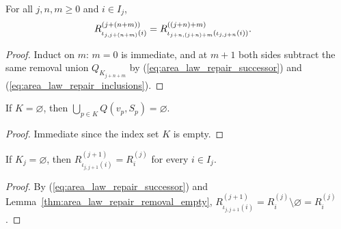 \begin{lemma}
    \label{thm:area_law_repair_current_inclusion_add}
    \leanok
    For all $j,n,m\ge0$ and $i\in I_j$,
    \begin{align}
        R_{\iota_{j,j+(n+m)}(i)}^{(j+(n+m))}
         & =R_{\iota_{j+n,(j+n)+m}(\iota_{j,j+n}(i))}^{((j+n)+m)}.\notag
    \end{align}
\end{lemma}

\begin{proof}\leanok
    Induct on $m$: $m=0$ is immediate, and at $m+1$ both sides subtract the same removal union
    $Q_{K_{j+n+m}}$ by (\ref{eq:area_law_repair_successor}) and (\ref{eq:area_law_repair_inclusions}).
\end{proof}

\begin{lemma}
    \label{thm:area_law_repair_removal_empty}
    \leanok
    If $K=\varnothing$, then $\bigcup_{p\in K}Q(v_p,S_p)=\varnothing$.
\end{lemma}

\begin{proof}\leanok
    Immediate since the index set $K$ is empty.
\end{proof}

\begin{lemma}
    \label{thm:area_law_repair_current_empty_step}
    \leanok
    If $K_j=\varnothing$, then $R_{\iota_{j,j+1}(i)}^{(j+1)}=R_i^{(j)}$ for every $i\in I_j$.
\end{lemma}

\begin{proof}\leanok
    By (\ref{eq:area_law_repair_successor}) and Lemma~\ref{thm:area_law_repair_removal_empty},
    $R_{\iota_{j,j+1}(i)}^{(j+1)}=R_i^{(j)}\setminus\varnothing=R_i^{(j)}$.
\end{proof}

